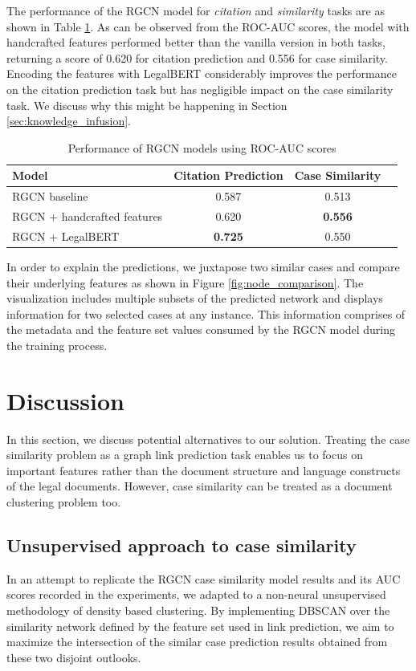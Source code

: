 \documentclass[12pt]{ceurart}
\begin{document}
The performance of the RGCN model for \textit{citation} and \textit{similarity} tasks are as shown in Table \ref{results}. As can be observed from the ROC-AUC scores, the model with handcrafted features performed better than the vanilla version in both tasks, returning a score of 0.620 for citation prediction and 0.556 for case similarity. Encoding the features with LegalBERT considerably improves the performance on the citation prediction task but has negligible impact on the case similarity task. We discuss why this might be happening in Section \ref{sec:knowledge_infusion}.


\begin{table}[htb]
\caption{Performance of RGCN models using ROC-AUC scores}
\label{results}
\centering
\begin{tabular}{lccc}
\hline
\textbf{Model} & \textbf{Citation Prediction} & \textbf{Case Similarity} \\
\hline
RGCN baseline     & 0.587                & 0.513           \\
RGCN + handcrafted features   & 0.620       & \textbf{0.556}   \\ 
RGCN + LegalBERT  & \textbf{0.725} & 0.550 \\
\hline
\end{tabular}
\end{table}

In order to explain the predictions, we juxtapose two similar cases and compare their underlying features as shown in Figure \ref{fig:node_comparison}. The visualization includes multiple subsets of the predicted network and displays information for two selected cases at any instance. This information comprises of the metadata and the feature set values consumed by the RGCN model during the training process.

\section{Discussion}
\label{sec:discussion}

In this section, we discuss potential alternatives to our solution. Treating the case similarity problem as a graph link prediction task enables us to focus on important features rather than the document structure and language constructs of the legal documents. However, case similarity can be treated as a document clustering problem too.

\subsection{Unsupervised approach to case similarity}
In an attempt to replicate the RGCN case similarity model results and its AUC scores recorded in the experiments, we adapted to a non-neural unsupervised methodology of density based clustering. By implementing DBSCAN over the similarity network defined by the feature set used in link prediction, we aim to maximize the intersection of the similar case prediction results obtained from these two disjoint outlooks.
\end{document}
